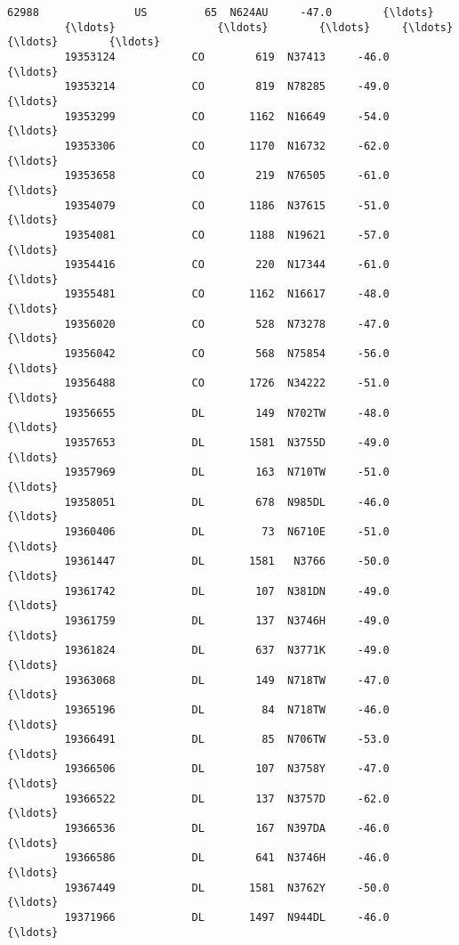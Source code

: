 \documentclass[11pt]{article}
\begin{document}
\begin{Verbatim}[commandchars=\\\{\}]
         62988               US         65  N624AU     -47.0        {\ldots}           
         {\ldots}                {\ldots}        {\ldots}     {\ldots}       {\ldots}        {\ldots}           
         19353124            CO        619  N37413     -46.0        {\ldots}           
         19353214            CO        819  N78285     -49.0        {\ldots}           
         19353299            CO       1162  N16649     -54.0        {\ldots}           
         19353306            CO       1170  N16732     -62.0        {\ldots}           
         19353658            CO        219  N76505     -61.0        {\ldots}           
         19354079            CO       1186  N37615     -51.0        {\ldots}           
         19354081            CO       1188  N19621     -57.0        {\ldots}           
         19354416            CO        220  N17344     -61.0        {\ldots}           
         19355481            CO       1162  N16617     -48.0        {\ldots}           
         19356020            CO        528  N73278     -47.0        {\ldots}           
         19356042            CO        568  N75854     -56.0        {\ldots}           
         19356488            CO       1726  N34222     -51.0        {\ldots}           
         19356655            DL        149  N702TW     -48.0        {\ldots}           
         19357653            DL       1581  N3755D     -49.0        {\ldots}           
         19357969            DL        163  N710TW     -51.0        {\ldots}           
         19358051            DL        678  N985DL     -46.0        {\ldots}           
         19360406            DL         73  N6710E     -51.0        {\ldots}           
         19361447            DL       1581   N3766     -50.0        {\ldots}           
         19361742            DL        107  N381DN     -49.0        {\ldots}           
         19361759            DL        137  N3746H     -49.0        {\ldots}           
         19361824            DL        637  N3771K     -49.0        {\ldots}           
         19363068            DL        149  N718TW     -47.0        {\ldots}           
         19365196            DL         84  N718TW     -46.0        {\ldots}           
         19366491            DL         85  N706TW     -53.0        {\ldots}           
         19366506            DL        107  N3758Y     -47.0        {\ldots}           
         19366522            DL        137  N3757D     -62.0        {\ldots}           
         19366536            DL        167  N397DA     -46.0        {\ldots}           
         19366586            DL        641  N3746H     -46.0        {\ldots}           
         19367449            DL       1581  N3762Y     -50.0        {\ldots}           
         19371966            DL       1497  N944DL     -46.0        {\ldots}           
         

\end{Verbatim}
\end{document}
